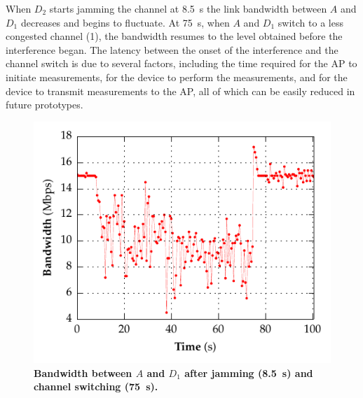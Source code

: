 When $D_2$ starts jamming the channel at 8.5~s the link bandwidth between $A$
and $D_1$ decreases and begins to fluctuate. At 75~s, when $A$ and $D_1$
switch to a less congested channel (1), the bandwidth resumes to the level
obtained before the interference began. The latency between the onset of the
interference and the channel switch is due to several factors, including the
time required for the AP to initiate measurements, for the device to perform
the measurements, and for the device to transmit measurements to the AP, all
of which can be easily reduced in future prototypes.

\begin{figure}[t]
  \centering
  \vspace*{-1.3mm}
  \includegraphics[width=\columnwidth]{./figures/ChannelBWGraph.pdf}
  \vspace*{-4mm}
  \caption{\textbf{Bandwidth between $A$ and $D_1$ after jamming (8.5~s) and
  channel switching (75~s).}}
  \label{fig:bw}
  \vspace*{-4mm}
\end{figure}
